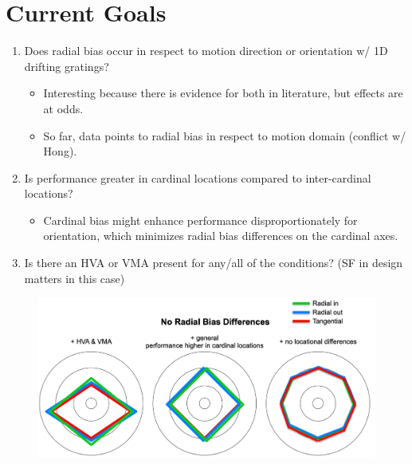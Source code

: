 \documentclass[11pt]{article} %
\begin{document}
\section{Current Goals} 
\begin{enumerate}
	\item Does radial bias occur in respect to motion direction or orientation w/ 1D drifting gratings? 
	\begin{itemize}
	\item{Interesting because there is evidence for both in literature, but effects are at odds.} 
	\item{So far, data points to radial bias in respect to motion domain (conflict w/ Hong).}
	\end{itemize}
	\item Is performance greater in cardinal locations compared to inter-cardinal locations?
	\begin{itemize}
	\item{Cardinal bias might enhance performance disproportionately for orientation, which minimizes radial bias differences on the cardinal axes.}
	\end{itemize}
	\item Is there an HVA or VMA present for any/all of the conditions? (SF in design matters in this case)
	\end{enumerate}
	\begin{figure}[H]
	\centering %
	\includegraphics[scale=.25]{Images/Cartoon1.png}
	\end{figure}
\end{document}
